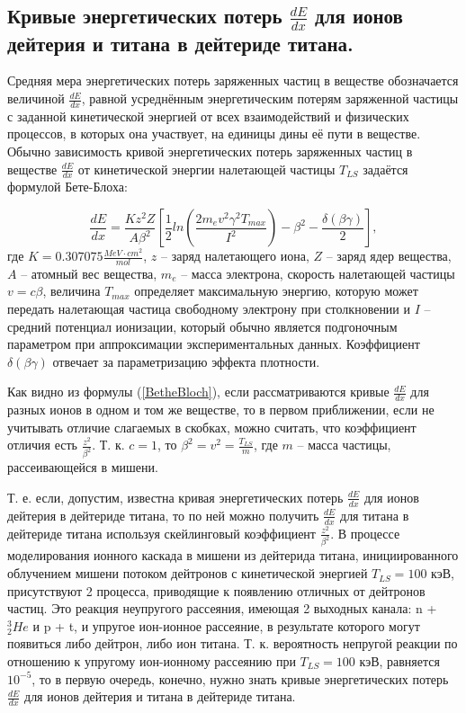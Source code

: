 \documentclass[a4paper,12pt]{article}
\begin{document}
\begin{large}
\subsection{Кривые энергетических потерь $\frac{dE}{dx}$ для ионов дейтерия и титана в дейтериде титана.}
\label{ValdEdx1}

	Средняя мера энергетических потерь заряженных частиц в веществе обозначается величиной $\frac{dE}{dx}$, равной усреднённым энергетическим потерям заряженной частицы с заданной кинетической энергией от всех взаимодействий и физических процессов, в которых она участвует, на единицы дины её пути в веществе.
	Обычно зависимость кривой энергетических потерь заряженных частиц в веществе $\frac{dE}{dx}$ от кинетической энергии налетающей частицы $T_{LS}$ задаётся формулой Бете-Блоха:
	
\begin{equation}
  \label{BetheBloch}
    \frac{dE}{dx}=\frac{Kz^2Z}{A\beta^2}\left[\frac{1}{2}ln\left(\frac{2m_ev^2\gamma^2T_{max}}{I^2}          \right)-\beta^2-\frac{\delta(\beta\gamma)}{2}\right],
\end{equation}
  	где $K=0.307075\frac{MeV\cdot cm^2}{mol}$, $z$ -- заряд налетающего иона, $Z$ -- заряд ядер вещества, $A$ -- атомный вес вещества, $m_e$ -- масса электрона, скорость налетающей частицы $v=c\beta$, величина $T_{max}$ определяет максимальную энергию, которую может передать налетающая частица свободному электрону при столкновении и $I$ -- средний потенциал ионизации, который обычно является подгоночным параметром при аппроксимации экспериментальных данных.
  	Коэффициент $\delta(\beta\gamma)$ отвечает за параметризацию эффекта плотности.
  
  	Как видно из формулы (\ref{BetheBloch}), если рассматриваются кривые $\frac{dE}{dx}$ для разных ионов в одном и том же веществе, то в первом приближении, если не учитывать отличие слагаемых в скобках, можно считать, что коэффициент отличия есть $\frac{z^2}{\beta^2}$.
  	Т. к. $c=1$, то $\beta^2=v^2=\frac{T_{LS}}{m}$, где $m$ -- масса частицы, рассеивающейся в мишени.
  
  	Т. е. если, допустим, известна кривая энергетических потерь $\frac{dE}{dx}$ для ионов дейтерия в дейтериде титана, то по ней можно получить $\frac{dE}{dx}$ для титана в дейтериде титана используя скейлинговый коэффициент $\frac{z^2}{\beta^2}$.
 	В процессе моделирования ионного каскада  в мишени из дейтерида титана, инициированного облучением мишени потоком дейтронов с кинетической энергией $T_{LS}=100$ кэВ, присутствуют 2 процесса, приводящие к появлению отличных от дейтронов частиц.
 	Это реакция неупругого рассеяния, имеющая 2 выходных канала: n + $^3_2He$ и p + t, и упругое ион-ионное рассеяние, в результате которого могут появиться либо дейтрон, либо ион титана.
 	Т. к. вероятность непругой реакции по отношению к упругому ион-ионному рассеянию при $T_{LS}=100$ кэВ, равняется $10^{-5}$, то в первую очередь, конечно, нужно знать кривые энергетических потерь $\frac{dE}{dx}$ для ионов дейтерия и титана в дейтериде титана.
  

\end{large}
\end{document}

